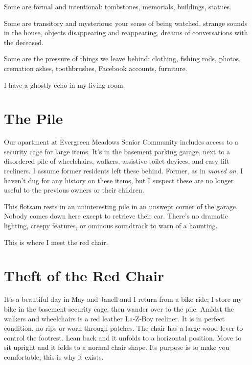 \documentclass[
  letterpaper,
  DIV=11,
  numbers=noendperiod]{scrreprt}
\begin{document}
Some are formal and intentional: tombstones, memorials, buildings,
statues.

Some are transitory and mysterious: your sense of being watched, strange
sounds in the house, objects disappearing and reappearing, dreams of
conversations with the deceased.

Some are the pressure of things we leave behind: clothing, fishing rods,
photos, cremation ashes, toothbrushes, Facebook accounts, furniture.

I have a ghostly echo in my living room.

\section*{The Pile}\label{the-pile}


Our apartment at Evergreen Meadows Senior Community includes access to a
security cage for large items. It's in the basement parking garage, next
to a disordered pile of wheelchairs, walkers, assistive toilet devices,
and easy lift recliners. I assume former residents left these behind.
Former, as in \emph{moved on}. I haven't dug for any history on these
items, but I suspect these are no longer useful to the previous owners
or their children.

This flotsam rests in an uninteresting pile in an unswept corner of the
garage. Nobody comes down here except to retrieve their car. There's no
dramatic lighting, creepy features, or ominous soundtrack to warn of a
haunting.

This is where I meet the red chair.

\section*{Theft of the Red Chair}\label{theft-of-the-red-chair}


It's a beautiful day in May and Janell and I return from a bike ride; I
store my bike in the basement security cage, then wander over to the
pile. Amidst the walkers and wheelchairs is a red leather La-Z-Boy
recliner. It is in perfect condition, no rips or worn-through patches.
The chair has a large wood lever to control the footrest. Lean back and
it unfolds to a horizontal position. Move to sit upright and it folds to
a normal chair shape. Its purpose is to make you comfortable; this is
why it exists.
\end{document}
